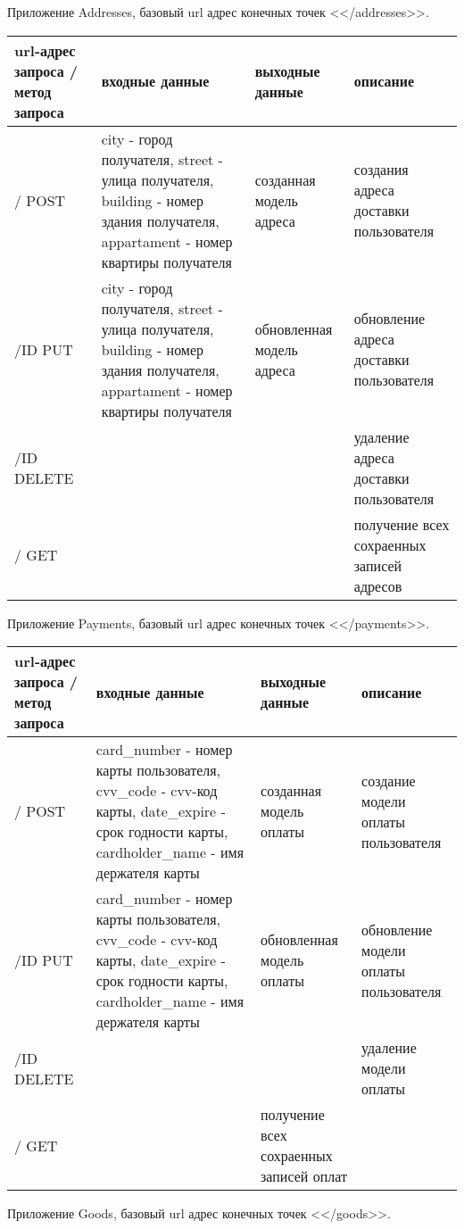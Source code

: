 Приложение Addresses, базовый url адрес конечных точек <</addresses>>.

\begin{longtable}{ | p{3cm} | p{4cm} | p{3cm} | p{3cm} | }
    \hline
    url-адрес запроса / метод запроса & входные данные & выходные данные  & описание \\ \hline
    / POST & city - город получателя, street - улица получателя, building - номер здания получателя, appartament - номер квартиры получателя & созданная модель адреса & создания адреса доставки пользователя \\ \hline
    /ID PUT & city - город получателя, street - улица получателя, building - номер здания получателя, appartament - номер квартиры получателя & обновленная модель адреса & обновление адреса доставки пользователя \\ \hline
    /ID DELETE & & & удаление адреса доставки пользователя \\ \hline
    / GET & & & получение всех сохраенных записей адресов \\ \hline
\end{longtable}

Приложение Payments, базовый url адрес конечных точек <</payments>>.

\begin{longtable}{ | p{3cm} | p{4cm} | p{3cm} | p{3cm} | }
    \hline
    url-адрес запроса / метод запроса & входные данные & выходные данные  & описание \\ \hline
    / POST & card\_number - номер карты пользователя, cvv\_code - cvv-код карты, date\_expire - срок годности карты, cardholder\_name - имя держателя карты & созданная модель оплаты & создание модели оплаты пользователя \\ \hline
    /ID PUT & card\_number - номер карты пользователя, cvv\_code - cvv-код карты, date\_expire - срок годности карты, cardholder\_name - имя держателя карты & обновленная модель оплаты & обновление модели оплаты пользователя \\ \hline
    /ID DELETE & & & удаление модели оплаты \\ \hline
    / GET & & получение всех сохраенных записей оплат \\ \hline
\end{longtable}

Приложение Goods, базовый url адрес конечных точек <</goods>>.

